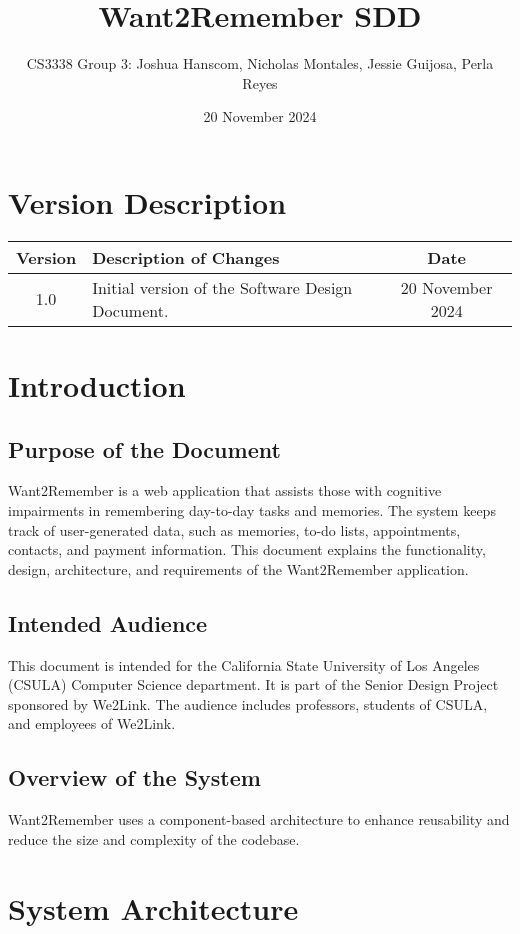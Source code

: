\documentclass{article}
\title{Want2Remember SDD}
\author{CS3338 Group 3: Joshua Hanscom, Nicholas Montales, Jessie Guijosa, Perla Reyes}
\date{20 November 2024}
\begin{document}
\maketitle
\newpage
\tableofcontents
\newpage

\section*{Version Description}
\begin{tabular}{|c|p{10cm}|c|}
\hline
\textbf{Version} & \textbf{Description of Changes} & \textbf{Date} \\ \hline
1.0 & Initial version of the Software Design Document. & 20 November 2024 \\ \hline
\end{tabular}
\newpage

\section{Introduction}
\subsection{Purpose of the Document}
Want2Remember is a web application that assists those with cognitive impairments in remembering day-to-day tasks and memories. The system keeps track of user-generated data, such as memories, to-do lists, appointments, contacts, and payment information. This document explains the functionality, design, architecture, and requirements of the Want2Remember application.

\subsection{Intended Audience}
This document is intended for the California State University of Los Angeles (CSULA) Computer Science department. It is part of the Senior Design Project sponsored by We2Link. The audience includes professors, students of CSULA, and employees of We2Link.

\subsection{Overview of the System}
Want2Remember uses a component-based architecture to enhance reusability and reduce the size and complexity of the codebase.

\section{System Architecture}
\end{document}
